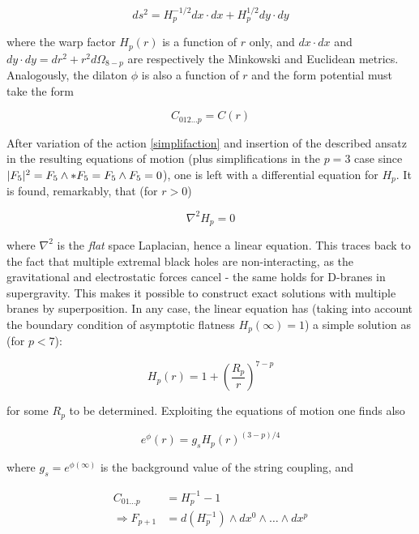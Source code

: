 \begin{equation}
	ds^2 = H_p^{-1/2} dx \cdot dx + H_p^{1/2} dy \cdot dy
	\label{}
\end{equation}

where the warp factor $H_p(r)$ is a function of $r$ only, and $dx \cdot dx$ and $dy \cdot dy = dr^2 + r^2 d\Omega_{8-p}$ are respectively the Minkowski and Euclidean metrics. Analogously, the dilaton $\phi$ is also a function of $r$ and the form potential must take the form

\begin{equation}
	C_{012\ldots p} = C(r)
	\label{}
\end{equation}

After variation of the action \eqref{simplifaction} and insertion of the described ansatz in the resulting equations of motion (plus simplifications in the $p=3$ case since $|F_5|^2 = F_5 \wedge \ast F_5 = F_5 \wedge F_5 = 0$), one is left with a differential equation for $H_p$. It is found, remarkably, that (for $r>0$)

\begin{equation}
	\nabla^2 H_p = 0
	\label{}
\end{equation}

where $\nabla^2$ is the \emph{flat} space Laplacian, hence a linear equation. This traces back to the fact that multiple extremal black holes are non-interacting, as the gravitational and electrostatic forces cancel - the same holds for D-branes in supergravity. This makes it possible to construct exact solutions with multiple branes by superposition. In any case, the linear equation has (taking into account the boundary condition of asymptotic flatness $H_p(\infty) = 1$) a simple solution as (for $p<7$):

\begin{equation}
	H_p(r) = 1 + \left( \frac{R_p}{r} \right)^{7-p}
	\label{warppbrane}
\end{equation}

for some $R_p$ to be determined. Exploiting the equations of motion one finds also

\begin{equation}
	e^\phi(r) = g_s H_p(r)^{(3-p)/4}
	\label{dilatonpbrane}
\end{equation}

where $g_s = e^{\phi(\infty)}$ is the background value of the string coupling, and

\begin{align}
	C_{01\ldots p} &= H_p^{-1} - 1  \\\Rightarrow
	F_{p+1} &= d(H_p^{-1}) \wedge dx^0 \wedge \ldots \wedge dx^p
	\label{}
\end{align}

